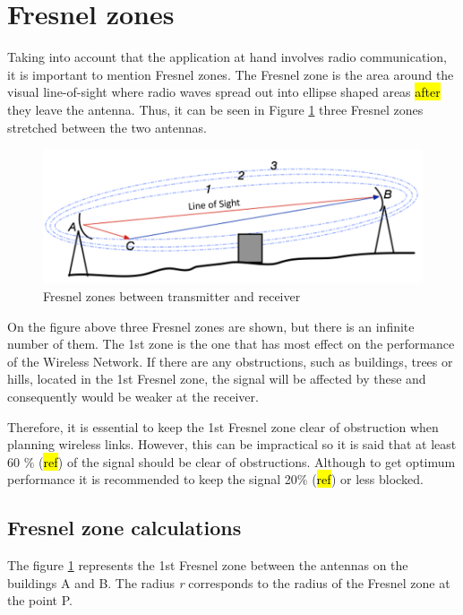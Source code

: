 \section{Fresnel zones}\label{sec:fresnel}
Taking into account that the application at hand involves radio communication, it is important to mention Fresnel zones. The Fresnel zone is the area around the visual line-of-sight where radio waves spread out into ellipse shaped areas \hl{after} they leave the antenna. Thus, it can be seen in Figure \ref{fig:fresnel_zones} three Fresnel zones stretched between the two antennas. 

\begin{figure}[H]
	\centering
	\includegraphics[scale=0.65]{figures/fresnel_zones.png}
	\caption{Fresnel zones between transmitter and receiver}
	\label{fig:fresnel_zones}
\end{figure}

On the figure above three Fresnel zones are shown, but there is an infinite number of them. The 1st zone is the one that has most effect on the performance of the Wireless Network. If there are any obstructions, such as buildings, trees or hills, located in the 1st Fresnel zone, the signal will be affected by these and consequently would be weaker at the receiver.

Therefore, it is essential to keep the 1st Fresnel zone clear of obstruction when planning wireless links. However, this can be impractical so it is said that at least 60 $\%$ (\hl{ref}) of the signal should be clear of obstructions. Although to get optimum performance it is recommended to keep the signal 20$\%$ (\hl{ref}) or less blocked.

\subsection{Fresnel zone calculations}
The figure \ref{fig:fresnel_zones} represents the 1st Fresnel zone between the antennas on the buildings A and B. The radius \textit{r} corresponds to the radius of the Fresnel zone at the point P. 

